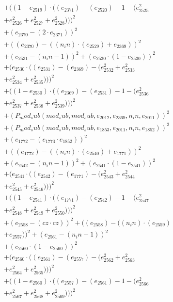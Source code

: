 \documentclass[10pt, a4paper]{article}
\begin{document}
\begin{small}
\begin{align*}
& + ((1 - e_{2519})  \cdot  ((e_{2371}) - (e_{2520}) - 1 - (e_{2525}^{2} \\
& + e_{2526}^{2} + e_{2527}^{2} + e_{2528}^{2})))^{2} \\
& + (e_{2370} - (2  \cdot  e_{2371}))^{2} \\
& + ((e_{2370}) - ((n_in)  \cdot  (e_{2529}) + e_{2369}))^{2} \\
& + (e_{2531} - (n_in - 1))^{2} + (e_{2530}  \cdot  (1 - e_{2530}))^{2} \\
& + (e_{2530}  \cdot  ((e_{2531}) - (e_{2369}) - (e_{2532}^{2} + e_{2533}^{2} \\
& + e_{2534}^{2} + e_{2535}^{2})))^{2} \\
& + ((1 - e_{2530})  \cdot  ((e_{2369}) - (e_{2531}) - 1 - (e_{2536}^{2} \\
& + e_{2537}^{2} + e_{2538}^{2} + e_{2539}^{2})))^{2} \\
& + (P_mod_sub(mod_sub, mod_sub, e_{2012}, e_{2369}, n_in, e_{2011}))^{2} \\
& + (P_mod_sub(mod_sub, mod_sub, e_{1853}, e_{2011}, n_in, e_{1852}))^{2} \\
& + (e_{1772} - (e_{1773}  \cdot  e_{1852}))^{2} \\
& + ((e_{1772}) - ((n_in)  \cdot  (e_{2540}) + e_{1771}))^{2} \\
& + (e_{2542} - (n_in - 1))^{2} + (e_{2541}  \cdot  (1 - e_{2541}))^{2} \\
& + (e_{2541}  \cdot  ((e_{2542}) - (e_{1771}) - (e_{2543}^{2} + e_{2544}^{2} \\
& + e_{2545}^{2} + e_{2546}^{2})))^{2} \\
& + ((1 - e_{2541})  \cdot  ((e_{1771}) - (e_{2542}) - 1 - (e_{2547}^{2} \\
& + e_{2548}^{2} + e_{2549}^{2} + e_{2550}^{2})))^{2} \\
& + (e_{2558} - (cz  \cdot  cz))^{2} + ((e_{2558}) - ((n_in)  \cdot  (e_{2559}) \\
& + e_{2557}))^{2} + (e_{2561} - (n_in - 1))^{2} \\
& + (e_{2560}  \cdot  (1 - e_{2560}))^{2} \\
& + (e_{2560}  \cdot  ((e_{2561}) - (e_{2557}) - (e_{2562}^{2} + e_{2563}^{2} \\
& + e_{2564}^{2} + e_{2565}^{2})))^{2} \\
& + ((1 - e_{2560})  \cdot  ((e_{2557}) - (e_{2561}) - 1 - (e_{2566}^{2} \\
& + e_{2567}^{2} + e_{2568}^{2} + e_{2569}^{2})))^{2} \\

\end{align*}
\end{small}
\end{document}
